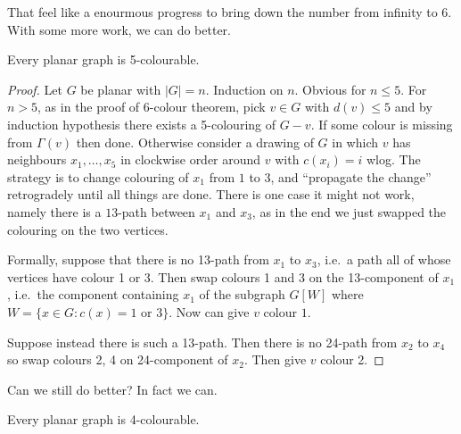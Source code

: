 \documentclass[a4paper]{article}
\begin{document}
That feel like a enourmous progress to bring down the number from infinity to 6. With some more work, we can do better.

\begin{theorem}
  Every planar graph is 5-colourable.
\end{theorem}

\begin{proof}
  Let \(G\) be planar with \(|G| = n\). Induction on \(n\). Obvious for \(n \leq 5\). For \(n > 5\), as in the proof of 6-colour theorem, pick \(v \in G\) with \(d(v) \leq 5\) and by induction hypothesis there exists a 5-colouring of \(G - v\). If some colour is missing from \(\Gamma(v)\) then done. Otherwise consider a drawing of \(G\) in which \(v\) has neighbours \(x_1, \dots, x_5\) in clockwise order around \(v\) with \(c(x_i) = i\) wlog. The strategy is to change colouring of \(x_1\) from \(1\) to \(3\), and ``propagate the change'' retrogradely until all things are done. There is one case it might not work, namely there is a \(13\)-path between \(x_1\) and \(x_3\), as in the end we just swapped the colouring on the two vertices.

  Formally, suppose that there is no 13-path from \(x_1\) to \(x_3\), i.e.\ a path all of whose vertices have colour 1 or 3. Then swap colours 1 and 3 on the 13-component of \(x_1\), i.e.\ the component containing \(x_1\) of the subgraph \(G[W]\) where \(W = \{x \in G: c(x) = 1 \text{ or } 3\}\). Now can give \(v\) colour \(1\).

  Suppose instead there is such a 13-path. Then there is no 24-path from \(x_2\) to \(x_4\) so swap colours 2, 4 on 24-component of \(x_2\). Then give \(v\) colour 2.
\end{proof}

Can we still do better? In fact we can.

\begin{theorem}
  Every planar graph is 4-colourable.
\end{theorem}
\end{document}
